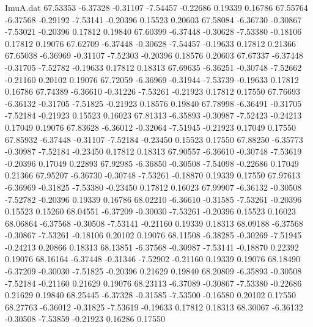 \begin{filecontents}{ImuA.dat}
  67.53353   -6.37328   -0.31107   -7.54457   -0.22686    0.19339    0.16786
  67.55764   -6.37568   -0.29192   -7.53141   -0.20396    0.15523    0.20603
  67.58084   -6.36730   -0.30867   -7.53021   -0.20396    0.17812    0.19840
  67.60399   -6.37448   -0.30628   -7.53380   -0.18106    0.17812    0.19076
  67.62709   -6.37448   -0.30628   -7.54457   -0.19633    0.17812    0.21366
  67.65038   -6.36969   -0.31107   -7.52303   -0.20396    0.18576    0.20603
  67.67337   -6.37448   -0.31705   -7.52782   -0.19633    0.17812    0.18313
  67.69635   -6.36251   -0.30748   -7.52662   -0.21160    0.20102    0.19076
  67.72059   -6.36969   -0.31944   -7.53739   -0.19633    0.17812    0.16786
  67.74389   -6.36610   -0.31226   -7.53261   -0.21923    0.17812    0.17550
  67.76693   -6.36132   -0.31705   -7.51825   -0.21923    0.18576    0.19840
  67.78998   -6.36491   -0.31705   -7.52184   -0.21923    0.15523    0.16023
  67.81313   -6.35893   -0.30987   -7.52423   -0.24213    0.17049    0.19076
  67.83628   -6.36012   -0.32064   -7.51945   -0.21923    0.17049    0.17550
  67.85932   -6.37448   -0.31107   -7.52184   -0.23450    0.15523    0.17550
  67.88250   -6.35773   -0.30987   -7.52184   -0.23450    0.17812    0.18313
  67.90557   -6.36610   -0.30748   -7.53619   -0.20396    0.17049    0.22893
  67.92985   -6.36850   -0.30508   -7.54098   -0.22686    0.17049    0.21366
  67.95207   -6.36730   -0.30748   -7.53261   -0.18870    0.19339    0.17550
  67.97613   -6.36969   -0.31825   -7.53380   -0.23450    0.17812    0.16023
  67.99907   -6.36132   -0.30508   -7.52782   -0.20396    0.19339    0.16786
  68.02210   -6.36610   -0.31585   -7.53261   -0.20396    0.15523    0.15260
  68.04551   -6.37209   -0.30030   -7.53261   -0.20396    0.15523    0.16023
  68.06864   -6.37568   -0.30508   -7.53141   -0.21160    0.19339    0.18313
  68.09188   -6.37568   -0.30867   -7.53261   -0.18106    0.20102    0.19076
  68.11508   -6.38285   -0.30269   -7.51945   -0.24213    0.20866    0.18313
  68.13851   -6.37568   -0.30987   -7.53141   -0.18870    0.22392    0.19076
  68.16164   -6.37448   -0.31346   -7.52902   -0.21160    0.19339    0.19076
  68.18490   -6.37209   -0.30030   -7.51825   -0.20396    0.21629    0.19840
  68.20809   -6.35893   -0.30508   -7.52184   -0.21160    0.21629    0.19076
  68.23113   -6.37089   -0.30867   -7.53380   -0.22686    0.21629    0.19840
  68.25445   -6.37328   -0.31585   -7.53500   -0.16580    0.20102    0.17550
  68.27763   -6.36012   -0.31825   -7.53619   -0.19633    0.17812    0.18313
  68.30067   -6.36132   -0.30508   -7.53859   -0.21923    0.16286    0.17550

\end{filecontents}
